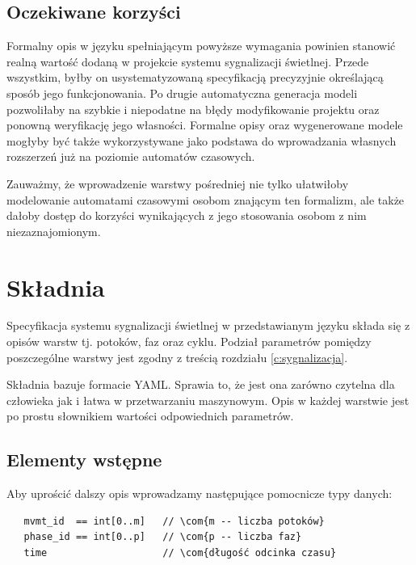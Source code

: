 \documentclass{pracamgr}
\theoremstyle{plain}
\newcommand{\com}[1]{\upshape\color{light-gray}{#1}}
\begin{document}
\subsection{Oczekiwane korzyści}
\label{ss:lang:req:benefits}
Formalny opis w języku spełniającym powyższe wymagania powinien
stanowić realną wartość dodaną w projekcie systemu sygnalizacji
świetlnej. Przede wszystkim, byłby on usystematyzowaną
specyfikacją precyzyjnie określającą sposób jego funkcjonowania. Po
drugie automatyczna generacja modeli pozwoliłaby na szybkie i
niepodatne na błędy modyfikowanie projektu oraz ponowną weryfikację jego
własności. Formalne opisy oraz wygenerowane modele mogłyby być także
wykorzystywane jako podstawa do wprowadzania własnych rozszerzeń już
na poziomie automatów czasowych.

Zauważmy, że wprowadzenie warstwy pośredniej nie tylko ułatwiłoby
modelowanie automatami czasowymi osobom znającym ten formalizm, ale
także dałoby dostęp do korzyści wynikających z jego stosowania osobom
z nim niezaznajomionym.


\section{Składnia}
\label{c:lang:lang}
Specyfikacja systemu sygnalizacji świetlnej w przedstawianym języku
składa się z opisów warstw tj. potoków, faz oraz cyklu.
Podział parametrów pomiędzy poszczególne warstwy jest zgodny
z treścią rozdziału \ref{c:sygnalizacja}.

Składnia bazuje formacie YAML\cite{YAML}. Sprawia to, że jest ona
zarówno czytelna dla człowieka jak i łatwa w przetwarzaniu
maszynowym. Opis w każdej warstwie jest po prostu słownikiem wartości
odpowiednich parametrów.


\subsection{Elementy wstępne}
Aby uprościć dalszy opis wprowadzamy następujące pomocnicze typy danych:
\begin{lstlisting}
   mvmt_id  == int[0..m]   // \com{m -- liczba potoków}
   phase_id == int[0..p]   // \com{p -- liczba faz}
   time                    // \com{długość odcinka czasu}
\end{lstlisting}
\end{document}
